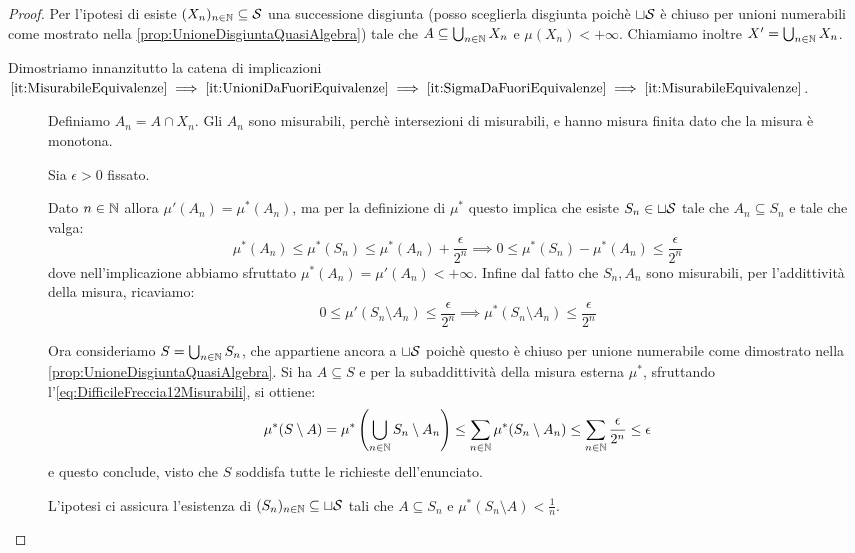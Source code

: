 \begin{proof}
	Per l'ipotesi di \sigfin[ezza] esiste $(X_n)_{n\in\N}\subseteq \S$ una successione disgiunta (posso sceglierla disgiunta poichè $\sqcup\S$ è chiuso per unioni numerabili come mostrato nella \cref{prop:UnioneDisgiuntaQuasiAlgebra}) tale che $A\subseteq \bigcup_{n\in\N}X_n$ e $\mu(X_n)<+\infty$. Chiamiamo inoltre $X'=\bigcup_{n\in\N}X_n$.
	
	Dimostriamo innanzitutto la catena di implicazioni
	$\text{\ref{it:MisurabileEquivalenze}}\implies
	\text{\ref{it:UnioniDaFuoriEquivalenze}}\implies
	\text{\ref{it:SigmaDaFuoriEquivalenze}}\implies
	\text{\ref{it:MisurabileEquivalenze}}$.
	\begin{description}
		\item[] Definiamo $A_n=A\cap X_n$. Gli $A_n$ sono misurabili, perchè intersezioni di misurabili, e hanno misura finita dato che la misura è monotona.
		
		Sia $\epsilon>0$ fissato.
		
		Dato $n\in\N$ allora $\mu'(A_n)=\mu^*(A_n)$, ma per la definizione di $\mu^*$ questo implica che esiste $S_n\in\sqcup \S$ tale che $A_n\subseteq S_n$ e tale che valga:
		\begin{equation*}
			\mu^*(A_n)\le \mu^*(S_n) \le \mu^*(A_n)+\frac\epsilon{2^n}\implies
			0\le \mu^*(S_n)-\mu^*(A_n)\le \frac\epsilon{2^n}
		\end{equation*}
		dove nell'implicazione abbiamo sfruttato $\mu^*(A_n)=\mu'(A_n)<+\infty$.
		Infine dal fatto che $S_n,A_n$ sono misurabili, per l'addittività della misura, ricaviamo:
		\begin{equation}\label{eq:DifficileFreccia12Misurabili}
			0\le \mu'(S_n\setminus A_n) \le \frac\epsilon{2^n} \implies \mu^*(S_n\setminus A_n)\le \frac\epsilon{2^n}
		\end{equation}
		
		Ora consideriamo $S=\bigcup_{n\in\N}S_n$, che appartiene ancora a $\sqcup\S$ poichè questo è chiuso per unione numerabile come dimostrato nella \cref{prop:UnioneDisgiuntaQuasiAlgebra}. Si ha $A\subseteq S$ e per la subaddittività della misura esterna  $\mu^*$, sfruttando l'\cref{eq:DifficileFreccia12Misurabili}, si ottiene:
		\begin{equation*}
			\mu^*(S\setminus A)=\mu^*\left(\bigcup_{n\in\N}S_n\setminus A_n\right)\le
			\sum_{n\in\N}\mu^*(S_n\setminus A_n)\le\sum_{n\in\N}\frac\epsilon{2^n}\le \epsilon
		\end{equation*}
		e questo conclude, visto che $S$ soddisfa tutte le richieste dell'enunciato.
		\item[] L'ipotesi ci assicura l'esistenza di $(S_n)_{n\in\N}\subseteq \sqcup \S$ tali che $A\subseteq S_n$ e $\mu^*(S_n\setminus A)<\frac1n$.
		

\end{description}
\end{proof}
